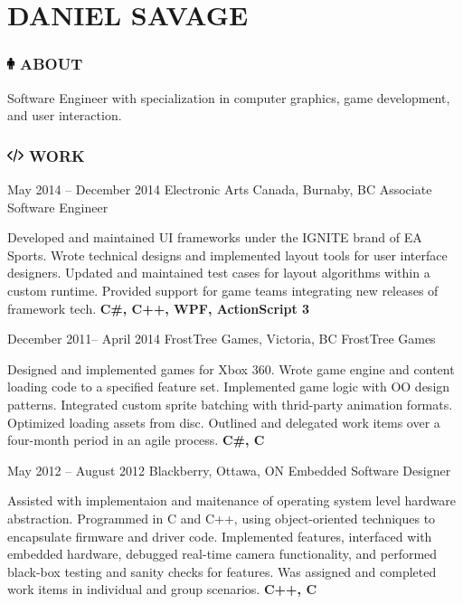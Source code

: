 \documentclass[10pt]{tccv}
\begin{document}
\part{DANIEL SAVAGE}

\flafamily

\section{\includegraphics[height=10pt, keepaspectratio=true]{male} ABOUT}

Software Engineer with specialization in computer graphics, game development, and user interaction.

\section{\includegraphics[height=10pt, keepaspectratio=true]{code} WORK}

\begin{eventlist}

\item{May 2014 -- December 2014}
     {Electronic Arts Canada, Burnaby, BC}
     {Associate Software Engineer}

Developed and maintained UI frameworks under the IGNITE brand of EA Sports. Wrote technical designs and implemented layout tools for user interface designers. Updated and maintained test cases for layout algorithms within a custom runtime. Provided support for game teams integrating new releases of framework tech. \textbf{C\#, C++, WPF, ActionScript 3}

\item{December 2011-- April 2014}
     {FrostTree Games, Victoria, BC}
     {FrostTree Games}

Designed and implemented games for Xbox 360. Wrote game engine and content loading code to a specified feature set. Implemented game logic with OO design patterns. Integrated custom sprite batching with thrid-party animation formats. Optimized loading assets from disc. Outlined and delegated work items over a four-month period in an agile process. \textbf{C\#, C}

\item{May 2012 -- August 2012}
     {Blackberry, Ottawa, ON}
     {Embedded Software Designer}

Assisted with implementaion and maitenance of operating system level hardware abstraction. Programmed in C and C++, using object-oriented techniques to encapsulate firmware and driver code. Implemented features, interfaced with embedded hardware, debugged real-time camera functionality, and performed black-box testing and sanity checks for features. Was assigned and completed work items in individual and group scenarios. \textbf{C++, C}

\end{eventlist}
\end{document}
